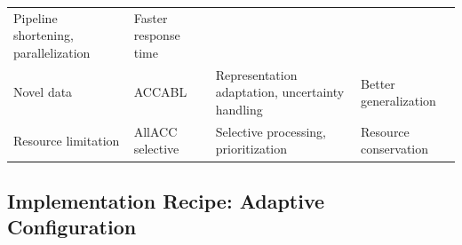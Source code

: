 \documentclass[
  11pt,
  letterpaper,
]{article}
\begin{document}
\begin{longtable}[]{@{}llll@{}}
\begin{minipage}[t]{0.30\columnwidth}
Pipeline shortening, parallelization\strut
\end{minipage} & \begin{minipage}[t]{0.21\columnwidth}\raggedright
Faster response time\strut
\end{minipage}\tabularnewline
\begin{minipage}[t]{0.19\columnwidth}\raggedright
Novel data\strut
\end{minipage} & \begin{minipage}[t]{0.19\columnwidth}\raggedright
ACCABL\strut
\end{minipage} & \begin{minipage}[t]{0.30\columnwidth}\raggedright
Representation adaptation, uncertainty handling\strut
\end{minipage} & \begin{minipage}[t]{0.21\columnwidth}\raggedright
Better generalization\strut
\end{minipage}\tabularnewline
\begin{minipage}[t]{0.19\columnwidth}\raggedright
Resource limitation\strut
\end{minipage} & \begin{minipage}[t]{0.19\columnwidth}\raggedright
AllACC selective\strut
\end{minipage} & \begin{minipage}[t]{0.30\columnwidth}\raggedright
Selective processing, prioritization\strut
\end{minipage} & \begin{minipage}[t]{0.21\columnwidth}\raggedright
Resource conservation\strut
\end{minipage}\tabularnewline
\bottomrule
\end{longtable}

\hypertarget{implementation-recipe-adaptive-configuration}{%
\subsection{Implementation Recipe: Adaptive
Configuration}\label{implementation-recipe-adaptive-configuration}}
\end{document}
